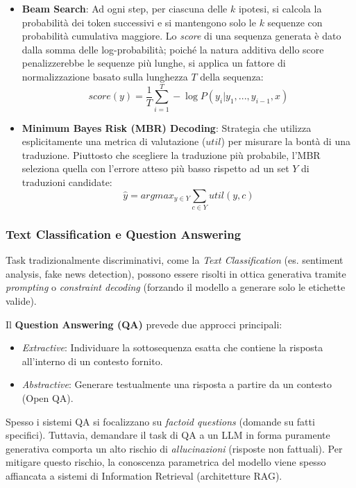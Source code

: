             \begin{itemize}
                \item \textbf{Beam Search}: Ad ogni step, per ciascuna delle $k$ ipotesi, si calcola la probabilità dei token successivi e si mantengono solo le $k$ sequenze con probabilità cumulativa maggiore.
                Lo \textit{score} di una sequenza generata è dato dalla somma delle log-probabilità; poiché la natura additiva dello score penalizzerebbe le sequenze più lunghe, si applica un fattore di normalizzazione basato sulla lunghezza $T$ della sequenza:
                $$score(y) = \frac{1}{T} \sum_{i=1}^{T} -\log P(y_i|y_1,...,y_{i-1}, x)$$

                \item \textbf{Minimum Bayes Risk (MBR) Decoding}: Strategia che utilizza esplicitamente una metrica di valutazione ($util$) per misurare la bontà di una traduzione. Piuttosto che scegliere la traduzione più probabile, l'MBR seleziona quella con l'errore atteso più basso rispetto ad un set $Y$ di traduzioni candidate:
                $$\hat{y} = argmax_{y \in Y} \sum_{c \in Y} util(y,c)$$
            \end{itemize}

        \subsubsection{Text Classification e Question Answering}
        
            Task tradizionalmente discriminativi, come la \textit{Text Classification} (es. sentiment analysis, fake news detection), possono essere risolti in ottica generativa tramite \textit{prompting} o \textit{constraint decoding} (forzando il modello a generare solo le etichette valide).

            Il \textbf{Question Answering (QA)} prevede due approcci principali:
            
            \begin{itemize}
                \item \textit{Extractive}: Individuare la sottosequenza esatta che contiene la risposta all'interno di un contesto fornito.
                \item \textit{Abstractive}: Generare testualmente una risposta a partire da un contesto (Open QA).
            \end{itemize}
            
            Spesso i sistemi QA si focalizzano su \textit{factoid questions} (domande su fatti specifici). Tuttavia, demandare il task di QA a un LLM in forma puramente generativa comporta un alto rischio di \textit{allucinazioni} (risposte non fattuali). Per mitigare questo rischio, la conoscenza parametrica del modello viene spesso affiancata a sistemi di Information Retrieval (architetture RAG).

